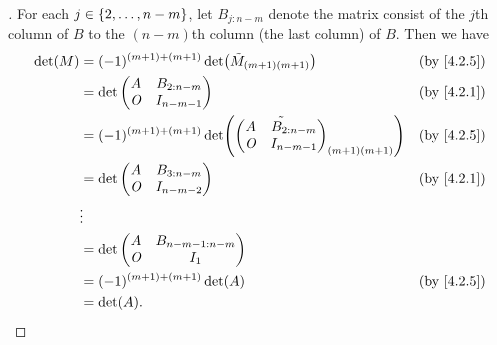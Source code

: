 \begin{proof}[]
  For each \(j \in \left\lbrace2, \dots, n - m\right\rbrace\), let \(B_{j : n - m}\) denote the matrix consist of the \(j\)th column of \(B\) to the \((n - m)\)th column (the last column) of \(B\).
  Then we have
  \begin{align*}
    \det(M) & = (-1)^{(m + 1) + (m + 1)} \det\pa{\tilde{M}_{(m + 1) (m + 1)}} &  & \text{(by \cref{4.2.5})}                   \\
            & = \det\begin{pmatrix}
                      A   & B_{2 : n - m} \\
                      \zm & I_{n - m - 1}
                    \end{pmatrix}                                          &  & \text{(by \cref{4.2.1})}                      \\
            & = (-1)^{(m + 1) + (m + 1)} \det\pa{\tilde{\begin{pmatrix}
                                                              A   & B_{2 : n - m} \\
                                                              \zm & I_{n - m - 1}
                                                            \end{pmatrix}}_{(m + 1) (m + 1)}}       &  & \text{(by \cref{4.2.5})} \\
            & = \det\begin{pmatrix}
                      A   & B_{3 : n - m} \\
                      \zm & I_{n - m - 2}
                    \end{pmatrix}                                          &  & \text{(by \cref{4.2.1})}                      \\
            & \vdots                                                                                                          \\
            & = \det\begin{pmatrix}
                      A   & B_{n - m - 1 : n - m} \\
                      \zm & I_1
                    \end{pmatrix}                                                                               \\
            & = (-1)^{(m + 1) + (m + 1)} \det(A)                              &  & \text{(by \cref{4.2.5})}                   \\
            & = \det(A).
  \end{align*}
\end{proof}


